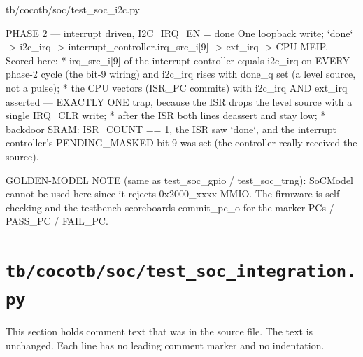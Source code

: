 \begin{relocated}{tb/cocotb/soc/test_soc_i2c.py}
\begin{textblock}
PHASE 2 — interrupt driven, I2C_IRQ_EN = done
One loopback write; `done` -> i2c_irq -> interrupt_controller.irq_src_i[9] -> ext_irq -> CPU MEIP.
Scored here:
* irq_src_i[9] of the interrupt controller equals i2c_irq on EVERY phase-2 cycle (the bit-9
wiring) and i2c_irq rises with done_q set (a level source, not a pulse);
* the CPU vectors (ISR_PC commits) with i2c_irq AND ext_irq asserted — EXACTLY ONE trap, because
the ISR drops the level source with a single IRQ_CLR write;
* after the ISR both lines deassert and stay low;
* backdoor SRAM: ISR_COUNT == 1, the ISR saw `done`, and the interrupt controller's
PENDING_MASKED bit 9 was set (the controller really received the source).

GOLDEN-MODEL NOTE (same as test_soc_gpio / test_soc_trng): SoCModel cannot be used here since it
rejects 0x2000_xxxx MMIO. The firmware is self-checking and the testbench scoreboards commit_pc_o
for the marker PCs / PASS_PC / FAIL_PC.
\end{textblock}

\end{relocated}

\section{\texttt{tb/cocotb/soc/test\_soc\_integration.py}}\label{tm:suite:soc-test-soc-integration}

This section holds comment text that was in the source file. The text is unchanged. Each line has no leading comment marker and no indentation.

